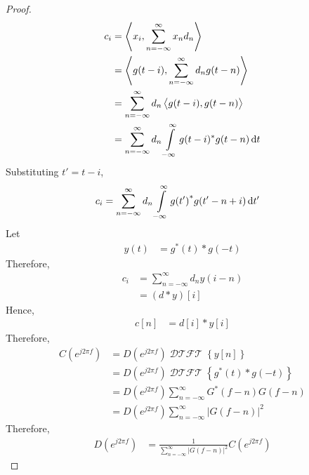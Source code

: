 \documentclass[titlepage, fleqn, a4paper, 12pt, twoside]{article}
\theoremstyle{definition}
\theoremstyle{theorem}
\DeclareMathOperator{\DTFT}{\mathcal{DTFT}}
\begin{document}
\begin{proof}
	\begin{align*}
		c_i &= \left\langle x_i , \sum\limits_{n = -\infty}^{\infty} x_n d_n \right\rangle\\
		&= \left\langle g(t - i) , \sum\limits_{n = -\infty}^{\infty} d_n g(t - n) \right\rangle\\
		&= \sum\limits_{n = -\infty}^{\infty} d_n \left\langle g(t - i) , g(t - n) \right\rangle\\
		&= \sum\limits_{n = -\infty}^{\infty} d_n \int\limits_{-\infty}^{\infty} g(t - i)^* g(t - n) \dif t
	\end{align*}
	Substituting $t' = t - i$,
	\begin{align*}
		c_i &= \sum\limits_{n = -\infty}^{\infty} d_n \int\limits_{-\infty}^{\infty} {g(t')}^* g(t' - n + i) \dif t'
	\end{align*}
	Let
	\begin{align*}
		y(t) &= g^*(t) \ast g(-t)
	\end{align*}
	Therefore,
	\begin{align*}
		c_i &= \sum\limits_{n = -\infty}^{\infty} d_n y(i - n)\\
		&= (d \ast y)[i]
	\end{align*}
	Hence,
	\begin{align*}
		c[n] &= d[i] \ast y[i]
	\end{align*}
	Therefore,
	\begin{align*}
		C\left( e^{j 2 \pi f} \right) &= D\left( e^{j 2 \pi f} \right) \DTFT\left\{ y[n] \right\}\\
		&= D\left( e^{j 2 \pi f} \right) \DTFT\left\{ g^*(t) \ast g(-t) \right\}\\
		&= D\left( e^{j 2 \pi f} \right) \sum\limits_{n = -\infty}^{\infty} G^*(f - n) G(f - n)\\
		&= D\left( e^{j 2 \pi f} \right) \sum\limits_{n = -\infty}^{\infty} \left| G(f - n) \right|^2
	\end{align*}
	Therefore,
	\begin{align*}
		D\left( e^{j 2 \pi f} \right) &= \frac{1}{\sum\limits_{n = -\infty}^{\infty} \left| G(f - n) \right|^2} C\left( e^{j 2 \pi f} \right)
	\end{align*}
\end{proof}
\end{document}
